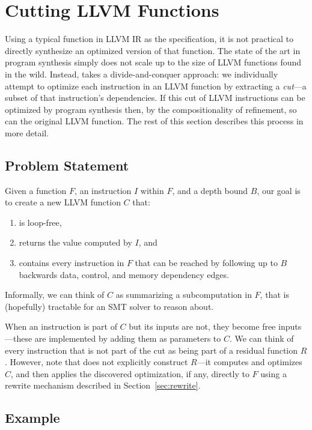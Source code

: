 \section{Cutting LLVM Functions}
\label{sec:cut}

Using a typical function in LLVM IR as the specification, it is not
practical to directly synthesize an optimized version of that
function.
%
The state of the art in program synthesis simply does not scale up to
the size of LLVM functions found in the wild.
%
Instead, \minotaur{} takes a divide-and-conquer approach: we individually
attempt to optimize each instruction in an LLVM function by extracting
a \textit{cut}---a subset of that instruction's dependencies.
%
If this cut of LLVM instructions can be optimized by program synthesis
then, by the compositionality of refinement, so can the original LLVM
function.
%
The rest of this section describes this process in more detail.


\subsection{Problem Statement}

Given a function $F$, an instruction $I$ within $F$, and a depth
bound $B$, our goal is to create a new LLVM function $C$ that:
%
\begin{enumerate}
\item
  is loop-free,
\item
  returns the value computed by $I$, and
\item
  contains every instruction in $F$ that can be reached by following
  up to $B$ backwards data, control, and memory dependency edges.
\end{enumerate}
%
Informally, we can think of $C$ as summarizing a subcomputation in
$F$, that is (hopefully) tractable for an SMT solver to reason about.


When an instruction is part of $C$ but its inputs are not, they
become free inputs---these are implemented by adding them as
parameters to $C$.
%
We can think of every instruction that is not part of the cut as being
part of a residual function $R$.
%
However, note that \minotaur{} does not explicitly construct $R$---it
computes and optimizes $C$, and then applies the discovered
optimization, if any, directly to $F$ using a rewrite mechanism
described in Section~\ref{sec:rewrite}.


\subsection{Example}

